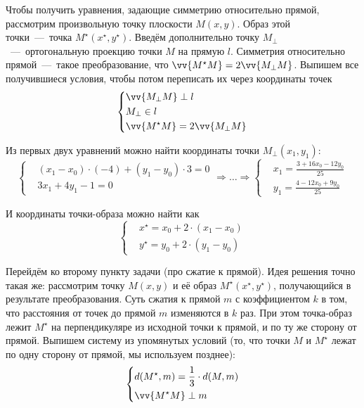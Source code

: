 \documentclass[a4paper,12pt]{article}
\begin{document}
  \begin{solution}
    
    Чтобы получить уравнения, задающие симметрию относительно прямой, рассмотрим произвольную точку плоскости $M(x, y)$.
    Образ этой точки~---~точка $M^\star(x^\star, y^\star)$.
    Введём дополнительно точку $M_\perp$~---~ортогональную проекцию точки $M$ на прямую $l$.
    Симметрия относительно прямой~---~такое преобразование, что $\vv{M^\star M} \hm= 2 \vv{M_\perp M}$.
    Выпишем все получившиеся условия, чтобы потом переписать их через координаты точек
    \[
      \left\{
        \begin{aligned}
          &\vv{M_\perp M} \perp l\\
          &M_\perp \in l\\
          &\vv{M^\star M} = 2 \vv{M_\perp M}
        \end{aligned}
      \right.
    \]
    
    Из первых двух уравнений можно найти координаты точки $M_\perp(x_1, y_1)$:
    \[
      \left\{
        \begin{aligned}
          &(x_1 - x_0) \cdot (-4) + (y_1 - y_0) \cdot 3 = 0\\
          &3x_1 + 4y_1 - 1 = 0
        \end{aligned}
      \right.
      \Rightarrow \ldots
      \Rightarrow \left\{
        \begin{aligned}
          &x_1 = \frac{3 + 16x_0 - 12y_0}{25}\\
          &y_1 = \frac{4 - 12x_0 + 9y_0}{25}
        \end{aligned}
      \right.
    \]
    
    И координаты точки-образа можно найти как
    \[
      \left\{
        \begin{aligned}
          &x^\star = x_0 + 2 \cdot (x_1 - x_0)\\
          &y^\star = y_0 + 2 \cdot (y_1 - y_0)
        \end{aligned}
      \right.
    \]
    
    \bigskip
    
    
    Перейдём ко второму пункту задачи (про сжатие к прямой).
    Идея решения точно такая же: рассмотрим точку $M(x, y)$ и её образ $M^\star(x^\star, y^\star)$, получающийся в результате преобразования.
    Суть сжатия к прямой $m$ с коэффициентом $k$ в том, что расстояния от точек до прямой $m$ изменяются в $k$ раз.
    При этом точка-образ лежит $M^\star$ на перпендикуляре из исходной точки к прямой, и по ту же сторону от прямой.
    Выпишем систему из упомянутых условий (то, что точки $M$ и $M^\star$ лежат по одну сторону от прямой, мы используем позднее):
    \[
      \left\{
        \begin{aligned}
          &d(M^\star, m) = \frac{1}{3} \cdot d(M, m)\\
          &\vv{M^\star M} \perp m\\
        \end{aligned}
      \right.
    \]
    

\end{solution}
\end{document}
